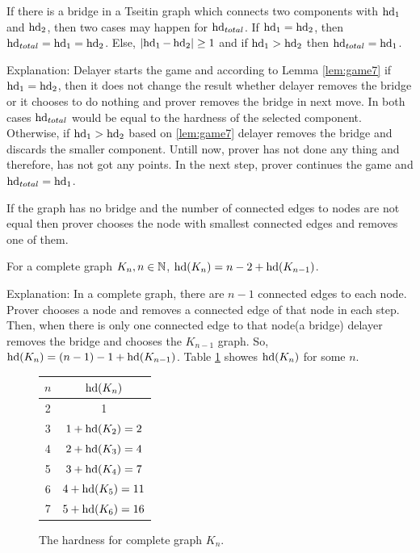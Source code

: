 \documentclass[12pt]{book}
\begin{document}
\begin{conj}\label{con:hd1}
     If there is a bridge in a Tseitin graph which connects two components with $\operatorname{hd}_1$ and $\operatorname{hd}_2$, then two cases may happen for 
	 $\operatorname{hd}_{total}$. If $\operatorname{hd}_1= \operatorname{hd}_2$, then $\operatorname{hd}_{total}= \operatorname{hd}_1= \operatorname{hd}_2$. Else, $ \lvert \operatorname{hd}_1- \operatorname{hd}_2  \rvert \geq 1$
	 and if $ \operatorname{hd}_1 > \operatorname{hd}_2 $  then $\operatorname{hd}_{total}= \operatorname{hd}_1$.
	 
	 Explanation: Delayer starts the game and according to Lemma \ref{lem:game7} if $\operatorname{hd}_1= \operatorname{hd}_2$, then it does not change the result 
	 whether delayer removes the bridge or it chooses to do nothing and prover removes the bridge in next move. In both cases $\operatorname{hd}_{total}$ 
	 would be equal to the hardness of the selected component. Otherwise, if $ \operatorname{hd}_1 > \operatorname{hd}_2 $ based on \ref{lem:game7} delayer 
	 removes the bridge and discards the smaller component. Untill now, prover has not done any thing and therefore, has not got any points.
	 In the next step, prover continues the game and  $\operatorname{hd}_{total}= \operatorname{hd}_1$.
\end{conj}

\begin{conj}\label{con:hd2}
           If the graph has no bridge and the number of connected edges to nodes are not equal then prover chooses the node with smallest
		   connected edges and removes one of them.
\end{conj}
	  
\begin{conj}\label{con:hd_game1}
      For a complete graph $K_n, n \in \mathbb{N}$, $\operatorname{hd}(K_n)= n-2+\operatorname{hd}(K_{n-1})$. 
	  
	  Explanation: In a complete graph, there are $n-1$ connected edges to each node. Prover chooses a node and removes a connected edge of 
	  that node in each step. Then, when there is only one connected edge to that node(a bridge) delayer removes the bridge and chooses the 
	  $K_{n-1}$ graph. So, $\operatorname{hd}(K_n)= (n-1)-1+\operatorname{hd}(K_{n-1}) $.
	  Table \ref{fig:table1} showes $\operatorname{hd}(K_n)$ for some $n$.
	  \begin{figure}[h]
       \centering
       \begin{tabular}{|c|c|} 
                  \hline
                  $n$ & $\operatorname{hd}(K_n)$ \\ \hline
				  2 & 1  \\ \hline
				  3 & $1+ \operatorname{hd}(K_2)=2$ \\ \hline
			      4 & $2+ \operatorname{hd}(K_3)=4$  \\ \hline
				  5 & $3+ \operatorname{hd}(K_4)=7$  \\ \hline
				  6 & $4+ \operatorname{hd}(K_5)=11$  \\ \hline
				  7 & $5+ \operatorname{hd}(K_6)=16$  \\ \hline
       \end{tabular}
       \caption{The hardness for complete graph $K_n$.}
       \label{fig:table1}
      \end{figure}
\end{conj}
\end{document}
